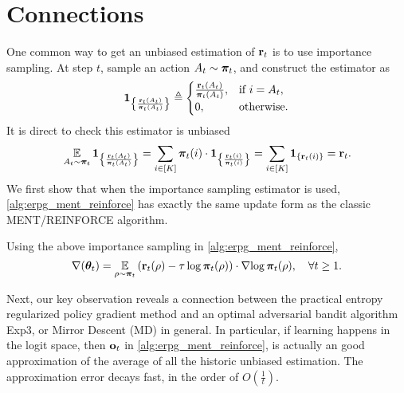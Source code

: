 \section{Connections}

One common way to get an unbiased estimation of ${\mathbf{r}}_t$ is to use importance sampling. At step $t$, sample an action $A_t \sim {\boldsymbol{\pi}}_t$, and construct the estimator as
\begin{equation*}
    {\mathbf{1}}_{ \left\{ \frac{{\mathbf{r}}_t(A_t) }{{\boldsymbol{\pi}}_t(A_t)}  \right\} } \triangleq \begin{cases}
		\frac{{\mathbf{r}}_t(A_t) }{{\boldsymbol{\pi}}_t(A_t)}, & \text{if } i = A_t, \\
		0, & \text{otherwise}.
		\end{cases}
\end{equation*}
It is direct to check this estimator is unbiased
\begin{equation*}
    \operatorname*{{\mathbb{E}}}\limits_{A_t \sim {\boldsymbol{\pi}}_t}{ {\mathbf{1}}_{ \left\{ \frac{{\mathbf{r}}_t(A_t) }{{\boldsymbol{\pi}}_t(A_t)}  \right\} } } = \sum\limits_{ i \in [K] }{ {\boldsymbol{\pi}}_t(i) \cdot {\mathbf{1}}_{ \left\{ \frac{{\mathbf{r}}_t(i) }{{\boldsymbol{\pi}}_t(i)}  \right\} }  } = \sum\limits_{i \in [K] }{ {\mathbf{1}}_{ \left\{ {\mathbf{r}}_t(i)  \right\} } } = {\mathbf{r}}_t.
\end{equation*}
We first show that when the importance sampling estimator is used, \cref{alg:erpg_ment_reinforce} has exactly the same update form as the classic MENT/REINFORCE algorithm.

\begin{lem}
\label{lem:equivalence_ment_reinforce}
Using the above importance sampling in \cref{alg:erpg_ment_reinforce},
\begin{equation*}
    \nabla{({\boldsymbol{\theta}}_t)} = \operatorname*{{\mathbb{E}}}\limits_{\rho \sim {\boldsymbol{\pi}}_t}{ \left( {\mathbf{r}}_t(\rho) - \tau \log{{\boldsymbol{\pi}}_t(\rho)} \right) \cdot \nabla{ \log{{\boldsymbol{\pi}}_t(\rho)} } }, \quad \forall t \ge 1.
\end{equation*}
\end{lem}

Next, our key observation reveals a connection between the practical entropy regularized policy gradient method and an optimal adversarial bandit algorithm Exp3, or Mirror Descent (MD) in general. In particular, if learning happens in the logit space, then ${\mathbf{o}}_t$ in \cref{alg:erpg_ment_reinforce}, is actually an good approximation of the average of all the historic unbiased estimation. The approximation error decays fast, in the order of $O\left( \frac{1}{t} \right)$.

